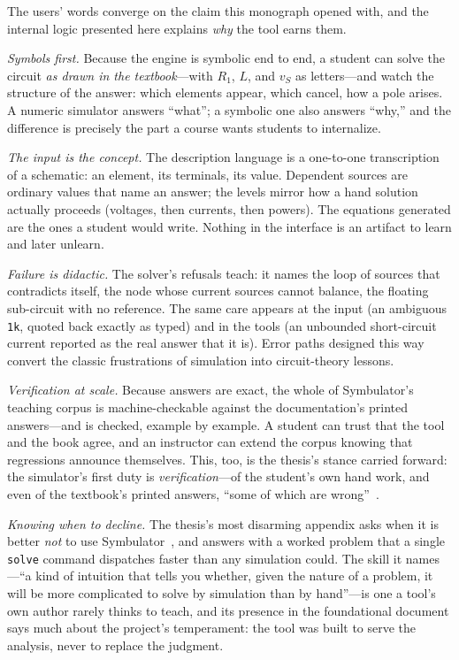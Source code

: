 \documentclass[11pt,oneside]{report}
\newcommand{\code}[1]{\texttt{#1}}
\begin{document}
The users' words converge on the claim this monograph opened with, and
the internal logic presented here explains \emph{why} the tool earns
them.

\emph{Symbols first.} Because the engine is symbolic end to end, a
student can solve the circuit \emph{as drawn in the textbook}---with
$R_1$, $L$, and $v_S$ as letters---and watch the structure of the
answer: which elements appear, which cancel, how a pole arises. A
numeric simulator answers ``what''; a symbolic one also answers
``why,'' and the difference is precisely the part a course wants
students to internalize.

\emph{The input is the concept.} The description language is a
one-to-one transcription of a schematic: an element, its terminals,
its value. Dependent sources are ordinary values that name an answer; the
levels mirror how a hand solution actually proceeds (voltages, then
currents, then powers). The equations generated are the ones a student
would write. Nothing in the interface is an artifact to learn and
later unlearn.

\emph{Failure is didactic.} The solver's refusals teach: it names the
loop of sources that contradicts itself, the node whose current
sources cannot balance, the floating sub-circuit with no reference.
The same care appears at the input (an ambiguous \code{1k}, quoted
back exactly as typed) and in the tools (an unbounded short-circuit
current reported as the real answer that it is). Error paths designed
this way convert the classic frustrations of simulation into
circuit-theory lessons.

\emph{Verification at scale.} Because answers are exact, the whole of
Symbulator's teaching corpus is machine-checkable against the
documentation's printed answers---and is checked, example by example.
A student can trust that the tool and the book agree, and an
instructor can extend the corpus knowing that regressions announce
themselves. This, too, is the thesis's stance carried forward: the
simulator's first duty is \emph{verification}---of the student's own
hand work, and even of the textbook's printed answers, ``some of
which are wrong''~\cite[Recs.]{thesis2000}.

\emph{Knowing when to decline.} The thesis's most disarming appendix
asks when it is better \emph{not} to use
Symbulator~\cite[App.~C]{thesis2000}, and answers with a worked
problem that a single \code{solve} command dispatches faster than
any simulation could. The skill it names---``a kind of intuition
that tells you whether, given the nature of a problem, it will be
more complicated to solve by simulation than by hand''---is one a
tool's own author rarely thinks to teach, and its presence in the
foundational document says much about the project's temperament:
the tool was built to serve the analysis, never to replace the
judgment.
\end{document}
